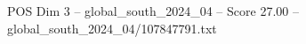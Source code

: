 \begin{textsample}{POS Dim 3 – global\_south\_2024\_04 – Score 27.00 – global\_south\_2024\_04/107847791.txt}
\end{textsample}
